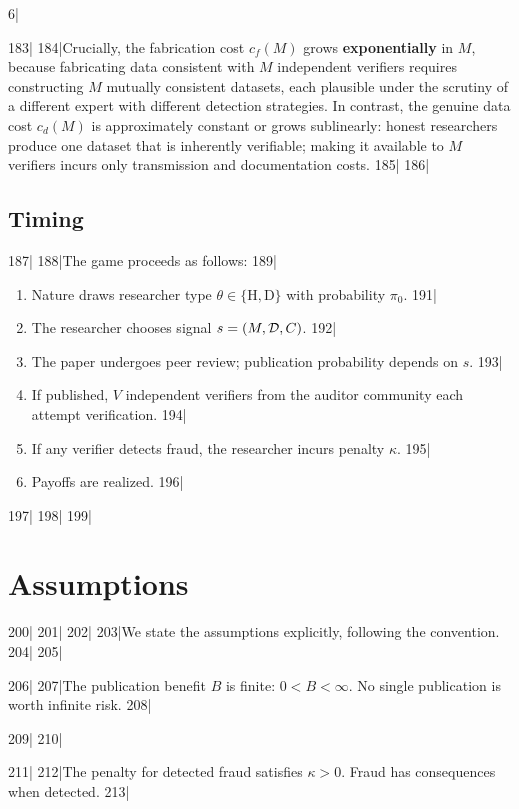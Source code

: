 6|\documentclass[12pt,a4paper]{article}
\begin{document}
183|
184|Crucially, the fabrication cost $c_f(M)$ grows \textbf{exponentially} in $M$, because fabricating data consistent with $M$ independent verifiers requires constructing $M$ mutually consistent datasets, each plausible under the scrutiny of a different expert with different detection strategies. In contrast, the genuine data cost $c_d(M)$ is approximately constant or grows sublinearly: honest researchers produce one dataset that is inherently verifiable; making it available to $M$ verifiers incurs only transmission and documentation costs.
185|
186|\subsection{Timing }
187|
188|The game proceeds as follows:
189|\begin{enumerate}[label=\textbf{Stage \arabic*:}, nosep]
190|    \item Nature draws researcher type $\theta \in \{\text{H}, \text{D}\}$ with probability $\pi_0$.
191|    \item The researcher chooses signal $s = (M, \mathcal{D}, C)$.
192|    \item The paper undergoes peer review; publication probability depends on $s$.
193|    \item If published, $V$ independent verifiers from the auditor community each attempt verification.
194|    \item If any verifier detects fraud, the researcher incurs penalty $\kappa$.
195|    \item Payoffs are realized.
196|\end{enumerate}
197|
198|%
199|\section{Assumptions }
200|\label{sec:assumptions}
201|%
202|
203|We state the assumptions explicitly, following the \SCX{} convention.
204|
205|\begin{assumption}
206|\label{asm:B}
207|The publication benefit $B$ is finite: $0 < B < \infty$. No single publication is worth infinite risk.
208|\end{assumption}
209|
210|\begin{assumption}
211|\label{asm:kappa}
212|The penalty for detected fraud satisfies $\kappa > 0$. Fraud has consequences when detected.
213|\end{assumption}
\end{document}
